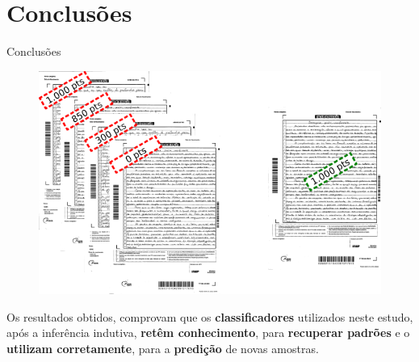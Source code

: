 \section{Conclusões}
  \begin{frame}[fragile]{Conclusões}
    \begin{figure}[H]
        \begin{center}
            \includegraphics[scale=0.50]{images/conclusao.png}
        \end{center}
    \end{figure}
  Os resultados obtidos, comprovam que os \textbf{classificadores} utilizados 
  neste estudo, após a inferência indutiva, \textbf{retêm conhecimento}, para 
  \textbf{recuperar padrões} e o \textbf{utilizam corretamente}, para a 
  \textbf{predição} de novas amostras.
  \end{frame}